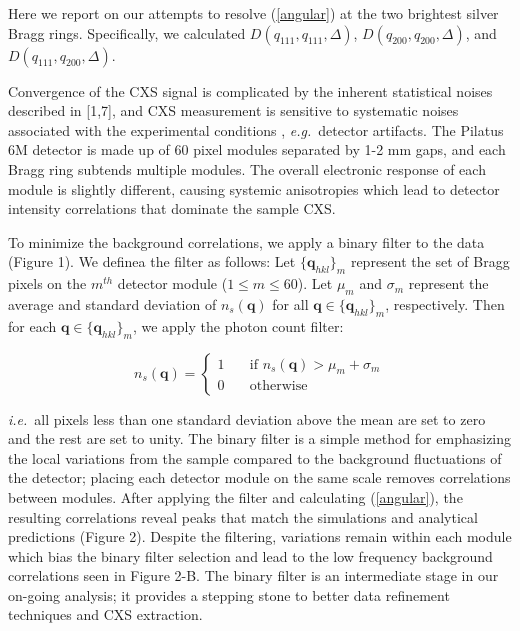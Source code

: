 \documentclass [11pt,fleqn]{article}
\begin{document}
Here we report on our attempts to resolve (\ref{angular}) at the two brightest silver Bragg rings. Specifically, we calculated $D (q_{111},q_{111}, \Delta  )$, $D (q_{200},q_{200}, \Delta  )$, and $D (q_{111},q_{200}, \Delta  )$. 

Convergence of the CXS signal is complicated by the inherent statistical noises described in [1,7], and CXS measurement is sensitive to systematic noises associated with the experimental conditions \cite{Kam:1981ua}, \textit{e.g.}~detector artifacts. The Pilatus 6M detector is made up of 60 pixel modules separated by 1-2 mm gaps, and each Bragg ring subtends multiple modules. The overall electronic response of each module is slightly different, causing systemic anisotropies which lead to detector intensity correlations that dominate the sample CXS. 

To minimize the background correlations, we apply a binary filter to the data (Figure 1). We definea the filter as follows: Let $\{ \bm q_{hkl} \}_{m}$ represent the set of Bragg pixels on the $m^{th}$ detector module ($1 \leq m \leq 60$). Let $\mu_m$ and $\sigma_m$ represent the average and standard deviation of $n_{s}(\bm q)$  for all $\bm q \in \{ \bm q_{hkl} \}_{m} $, respectively. Then for each $\bm q \in \{ \bm q_{hkl} \}_{m} $, we apply the photon count filter:

\[  n_{s}(\bm q ) = 
 \begin{cases} 
   1 & \quad \text{if } n_{s}(\bm q ) > \mu_m +  \sigma_m\\
   0 & \quad \text{otherwise} 
 \end{cases} 
 \]

\textit{i.e.}~all pixels less than one standard deviation above the mean are set to zero and the rest are set to unity. The binary filter is a simple method for emphasizing the local variations from the sample compared to the background fluctuations of the detector; placing each detector module on the same scale removes correlations between modules.  After applying the filter and calculating (\ref{angular}), the resulting correlations reveal peaks that match the simulations and analytical predictions (Figure 2). Despite the filtering, variations remain within each module which bias the binary filter selection and lead to the low frequency background correlations seen in Figure 2-B. The binary filter is an intermediate stage in our on-going analysis; it provides a stepping stone to better data refinement techniques and CXS extraction.
\end{document}
